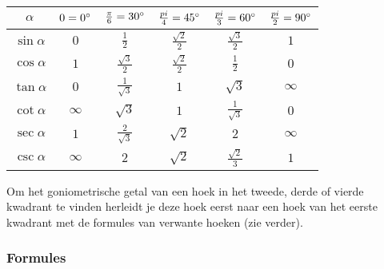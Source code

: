 \begin{center}
  \renewcommand{\arraystretch}{1.5}
  \begin{tabular}{c|ccccc}
    $\alpha$ & $0=0^\circ$ & $\frac{\pi}{6}=30^\circ$ & $\frac{pi}{4}=45^\circ$ & $\frac{pi}{3}=60^\circ$ & $\frac{pi}{2}=90^\circ$\\
    \hline
    $\sin\alpha$ & $0$ & $\frac{1}{2}$ & $\frac{\sqrt{2}}{2}$ & $\frac{\sqrt{3}}{2}$ & $1$\\
    $\cos\alpha$ & $1$ & $\frac{\sqrt{3}}{2}$ & $\frac{\sqrt{2}}{2}$ & $\frac{1}{2}$ & $0$\\
    $\tan\alpha$ & $0$ & $\frac{1}{\sqrt{3}}$ & $1$ & $\sqrt{3}$ & $\infty$\\
    $\cot\alpha$ & $\infty$ & $\sqrt{3}$ & $1$ & $\frac{1}{\sqrt{3}}$ & $0$\\
    $\sec\alpha$ & $1$ & $\frac{2}{\sqrt{3}}$ & $\sqrt{2}$ & $2$ & $\infty$\\
    $\csc\alpha$ & $\infty$ & $2$ & $\sqrt{2}$ & $\frac{\sqrt{2}}{3}$ & $1$\\
  \end{tabular}
\end{center}

Om het goniometrische getal van een hoek in het tweede, derde of vierde kwadrant te vinden herleidt je deze hoek eerst naar een hoek van het eerste kwadrant met de formules van verwante hoeken (zie verder).

\subsubsection{Formules} \label{goniometrische_formules}
\hypertarget{goniometrische_formules}{}

